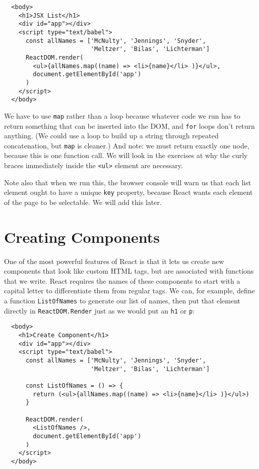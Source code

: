 \begin{verbatim}
  <body>
    <h1>JSX List</h1>
    <div id="app"></div>
    <script type="text/babel">
      const allNames = ['McNulty', 'Jennings', 'Snyder',
                        'Meltzer', 'Bilas', 'Lichterman']
      ReactDOM.render(
        <ul>{allNames.map((name) => <li>{name}</li> )}</ul>,
        document.getElementById('app')
      )
    </script>
  </body>
\end{verbatim}

We have to use \texttt{map} rather than a loop because whatever code we run has to return something
that can be inserted into the DOM,
and \texttt{for} loops don't return anything.
(We could use a loop to build up a string through repeated concatenation,
but \texttt{map} is cleaner.)
And note: we must return exactly one node,
because this is one function call.
We will look in the exercises at why the curly braces immediately inside the \texttt{{\textless}ul{\textgreater}{}} element are necessary.

Note also that when we run this,
the browser console will warn us that each list element ought to have a unique \texttt{key} property,
because React wants each element of the page to be selectable.
We will add this later.

\section{Creating Components}\label{s:dynamic-components}

One of the most powerful features of React is that it lets us create new components
that look like custom HTML tags,
but are associated with functions that we write.
React requires the names of these components to start with a capital letter
to differentiate them from regular tags.
We can,
for example,
define a function \texttt{ListOfNames} to generate our list of names,
then put that element directly in \texttt{ReactDOM.Render}
just as we would put an \texttt{h1} or \texttt{p}:

\begin{verbatim}
  <body>
    <h1>Create Component</h1>
    <div id="app"></div>
    <script type="text/babel">
      const allNames = ['McNulty', 'Jennings', 'Snyder',
                        'Meltzer', 'Bilas', 'Lichterman']

      const ListOfNames = () => {
        return (<ul>{allNames.map((name) => <li>{name}</li> )}</ul>)
      }

      ReactDOM.render(
        <ListOfNames />,
        document.getElementById('app')
      )
    </script>
  </body>
\end{verbatim}

